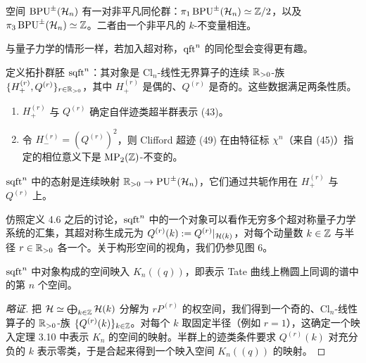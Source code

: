 
\begin{remark}[4.8]
空间 $\operatorname{BPU}^\pm(\mathcal{H}_n)$ 有一对非平凡同伦群：$\pi_1\operatorname{BPU}^\pm(\mathcal{H}_n)\simeq\mathbb{Z}/2$，以及 $\pi_3\operatorname{BPU}^\pm(\mathcal{H}_n)\simeq\mathbb{Z}$。二者由一个非平凡的 $k$-不变量相连。
\end{remark}

与量子力学的情形一样，若加入超对称，$\operatorname{qft}^n$ 的同伦型会变得更有趣。


\begin{definition}[4.9]
定义拓扑群胚 $\operatorname{sqft}^n$：其对象是 $\mathrm{Cl}_n$-线性无界算子的连续 $\mathbb{R}_{>0}$-族 $\{H^{(r)}_+,Q^{(r)}\}_{r\in\mathbb{R}_{>0}}$，其中 $H^{(r)}_+$ 是偶的、$Q^{(r)}$ 是奇的。这些数据满足两条性质。
\begin{enumerate}[label=(\roman*)]
  \item $H^{(r)}_+$ 与 $Q^{(r)}$ 确定自伴迹类超半群表示 (43)。
  \item 令 $H^{(r)}_-=(Q^{(r)})^2$，则 Clifford 超迹 (49) 在由特征标 $\chi^n$（来自 (45)）指定的相位意义下是 $\operatorname{MP}_2(\mathbb{Z})$-不变的。
\end{enumerate}
$\operatorname{sqft}^n$ 中的态射是连续映射 $\mathbb{R}_{>0}\to\mathrm{PU}^\pm(\mathcal{H}_n)$，它们通过共轭作用在 $H^{(r)}_+$ 与 $Q^{(r)}$ 上。
\end{definition}

仿照定义 4.6 之后的讨论，$\operatorname{sqft}^n$ 中的一个对象可以看作无穷多个超对称量子力学系统的汇集，其超对称生成元为 $Q^{(r)}(k):=Q^{(r)}|_{\mathcal{H}(k)}$，对每个动量数 $k\in\mathbb{Z}$ 与半径 $r\in\mathbb{R}_{>0}$ 各一个。关于构形空间的视角，我们仍参见图 6。


\begin{theorem}
$\operatorname{sqft}^n$ 中对象构成的空间映入 $K_n((q))$，即表示 Tate 曲线上椭圆上同调的谱中的第 $n$ 个空间。
\end{theorem}

\begin{proof}[略证]
把 $\mathcal{H}\simeq\bigoplus_{k\in\mathbb{Z}}\mathcal{H}(k)$ 分解为 $rP^{(r)}$ 的权空间，我们得到一个奇的、$\mathrm{Cl}_n$-线性算子的 $\mathbb{R}_{>0}$-族 $\{Q^{(r)}(k)\}_{k\in\mathbb{Z}}$。对每个 $k$ 取固定半径（例如 $r=1$），这确定一个映入定理 3.10 中表示 $K_n$ 的空间的映射。半群上的迹类条件要求 $Q^{(r)}(k)$ 对充分负的 $k$ 表示零类，于是合起来得到一个映入空间 $K_n((q))$ 的映射。
\end{proof}

